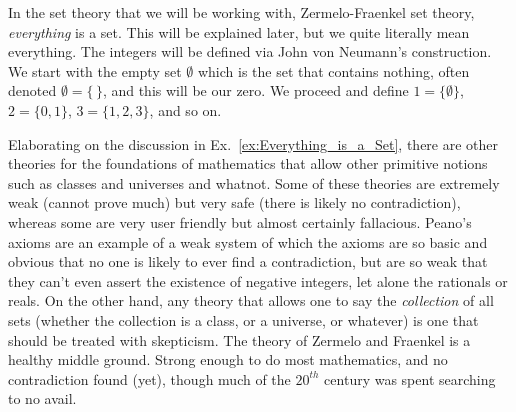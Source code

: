         \begin{example}
            \label{ex:Everything_is_a_Set}%
            In the set theory that we will be working with, Zermelo-Fraenkel set
            theory, \textit{everything} is a set. This will be explained later,
            but we quite literally mean everything. The integers will be defined
            via John von Neumann's construction. We
            start with the empty set $\emptyset$ which is the set that contains
            nothing, often denoted $\emptyset=\{\,\}$, and this will be our
            zero. We proceed and define $1=\{\emptyset\}$, $2=\{0,1\}$,
            $3=\{1,2,3\}$, and so on.
        \end{example}
        Elaborating on the discussion in Ex.~\ref{ex:Everything_is_a_Set}, there
        are other theories for the foundations of mathematics that allow other
        primitive notions such as classes and universes and whatnot. Some of
        these theories are extremely weak (cannot prove much) but very safe
        (there is likely no contradiction), whereas some are very user friendly
        but almost certainly fallacious. Peano's axioms are an example of a weak
        system of which the axioms are so basic and obvious that no one is
        likely to ever find a contradiction, but are so weak that they can't
        even assert the existence of negative integers, let alone the rationals
        or reals. On the other hand, any theory that allows one to say the
        \textit{collection} of all sets (whether the collection is a class, or a
        universe, or whatever) is one that should be treated with skepticism.
        The theory of Zermelo and Fraenkel is a healthy middle ground. Strong
        enough to do most mathematics, and no contradiction found (yet), though
        much of the $20^{th}$ century was spent searching to no avail.
